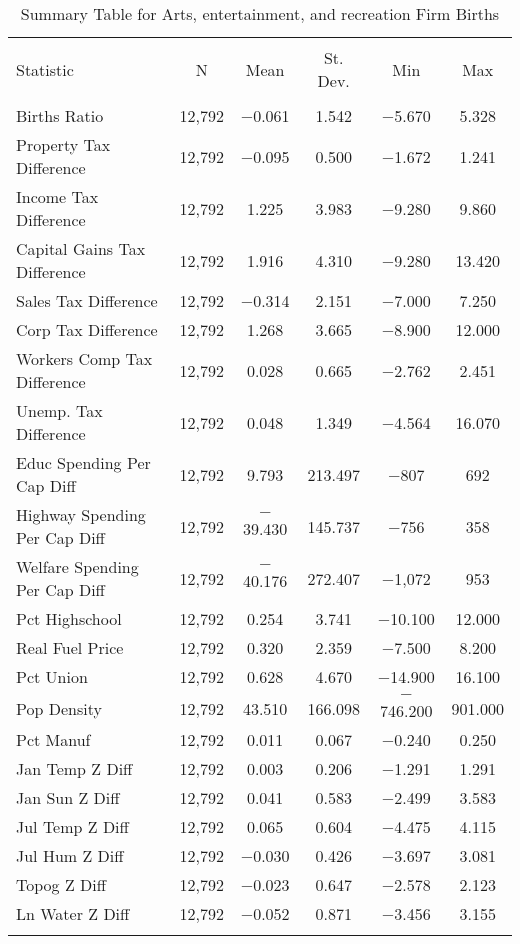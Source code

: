 
\begin{table}[!htbp] \centering 
  \caption{Summary Table for  Arts, entertainment, and recreation Firm Births} 
  \label{71summary} 
\begin{tabular}{@{\extracolsep{5pt}}lccccc} 
\\[-1.8ex]\hline 
\hline \\[-1.8ex] 
Statistic & \multicolumn{1}{c}{N} & \multicolumn{1}{c}{Mean} & \multicolumn{1}{c}{St. Dev.} & \multicolumn{1}{c}{Min} & \multicolumn{1}{c}{Max} \\ 
\hline \\[-1.8ex] 
Births Ratio & 12,792 & $-$0.061 & 1.542 & $-$5.670 & 5.328 \\ 
Property Tax Difference & 12,792 & $-$0.095 & 0.500 & $-$1.672 & 1.241 \\ 
Income Tax Difference & 12,792 & 1.225 & 3.983 & $-$9.280 & 9.860 \\ 
Capital Gains Tax Difference & 12,792 & 1.916 & 4.310 & $-$9.280 & 13.420 \\ 
Sales Tax Difference & 12,792 & $-$0.314 & 2.151 & $-$7.000 & 7.250 \\ 
Corp Tax Difference & 12,792 & 1.268 & 3.665 & $-$8.900 & 12.000 \\ 
Workers Comp Tax Difference & 12,792 & 0.028 & 0.665 & $-$2.762 & 2.451 \\ 
Unemp. Tax Difference & 12,792 & 0.048 & 1.349 & $-$4.564 & 16.070 \\ 
Educ Spending Per Cap Diff & 12,792 & 9.793 & 213.497 & $-$807 & 692 \\ 
Highway Spending Per Cap Diff & 12,792 & $-$39.430 & 145.737 & $-$756 & 358 \\ 
Welfare Spending Per Cap Diff & 12,792 & $-$40.176 & 272.407 & $-$1,072 & 953 \\ 
Pct Highschool & 12,792 & 0.254 & 3.741 & $-$10.100 & 12.000 \\ 
Real Fuel Price & 12,792 & 0.320 & 2.359 & $-$7.500 & 8.200 \\ 
Pct Union & 12,792 & 0.628 & 4.670 & $-$14.900 & 16.100 \\ 
Pop Density & 12,792 & 43.510 & 166.098 & $-$746.200 & 901.000 \\ 
Pct Manuf & 12,792 & 0.011 & 0.067 & $-$0.240 & 0.250 \\ 
Jan Temp Z Diff & 12,792 & 0.003 & 0.206 & $-$1.291 & 1.291 \\ 
Jan Sun Z Diff & 12,792 & 0.041 & 0.583 & $-$2.499 & 3.583 \\ 
Jul Temp Z Diff & 12,792 & 0.065 & 0.604 & $-$4.475 & 4.115 \\ 
Jul Hum Z Diff & 12,792 & $-$0.030 & 0.426 & $-$3.697 & 3.081 \\ 
Topog Z Diff & 12,792 & $-$0.023 & 0.647 & $-$2.578 & 2.123 \\ 
Ln Water Z Diff & 12,792 & $-$0.052 & 0.871 & $-$3.456 & 3.155 \\ 
\hline \\[-1.8ex] 
\end{tabular} 
\end{table} 
